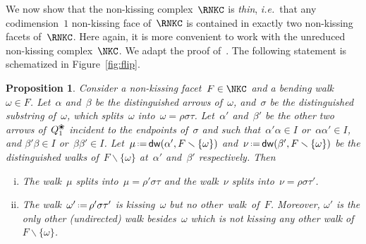 \documentclass{amsart}
\newtheorem{proposition}[theorem]{Proposition}
\theoremstyle{definition}
\newcommand{\ssm}{\smallsetminus} %
\newcommand{\eqdef}{\mbox{\,\raisebox{0.2ex}{\scriptsize\ensuremath{\mathrm:}}\ensuremath{=}\,}} %
\newcommand{\fref}[1]{Figure~\ref{#1}} %
\newcommand{\ie}{\textit{i.e.}~} %
\newcommand{\darkblue}{\color{darkblue}} %
\newcommand{\defn}[1]{\textsl{\darkblue #1}} %
\newcommand{\blossom}{^\text{\ding{96}}} %
\newcommand{\distinguishedWalk}[2]{\mathsf{dw}(#1,#2)} %
\begin{document}
We now show that the non-kissing complex~$\RNKC$ is \defn{thin}, \ie that any codimension~$1$ non-kissing face of~$\RNKC$ is contained in exactly two non-kissing facets of~$\RNKC$.
Here again, it is more convenient to work with the unreduced non-kissing complex~$\NKC$.
We adapt the proof of~\cite[Thm~3.2\,(3)]{McConville}.
The following statement is schematized in \fref{fig:flip}.

\begin{proposition}
\label{prop:flip}
Consider a non-kissing facet~$F \in \NKC$ and a bending walk~$\omega \in F$.
Let~$\alpha$ and~$\beta$ be the distinguished arrows of~$\omega$, and~$\sigma$ be the distinguished substring of~$\omega$, which splits~$\omega$ into~$\omega = \rho \sigma \tau$.
Let~$\alpha'$ and~$\beta'$ be the other two arrows of~$Q_1\blossom$ incident to the endpoints of~$\sigma$ and such that~$\alpha'\alpha \in I$ or~$\alpha\alpha' \in I$, and $\beta'\beta \in I$ or~$\beta\beta' \in I$.
Let~$\mu \eqdef \distinguishedWalk{\alpha'}{F \ssm \{\omega\}}$ and~$\nu \eqdef \distinguishedWalk{\beta'}{F \ssm \{\omega\}}$ be the distinguished walks of~$F \ssm \{\omega\}$ at~$\alpha'$ and~$\beta'$ respectively.
Then
\begin{enumerate}[(i)]
\item The walk~$\mu$ splits into~$\mu = \rho' \sigma \tau$ and the walk~$\nu$ splits into~$\nu = \rho \sigma \tau'$.
\item The walk~$\omega' \eqdef \rho' \sigma \tau'$ is kissing~$\omega$ but no other~walk~of~$F$. Moreover, $\omega'$ is the only other (undirected) walk besides~$\omega$ which is not kissing any other walk of~$F \ssm \{\omega\}$.
\end{enumerate}
\end{proposition}
\end{document}
